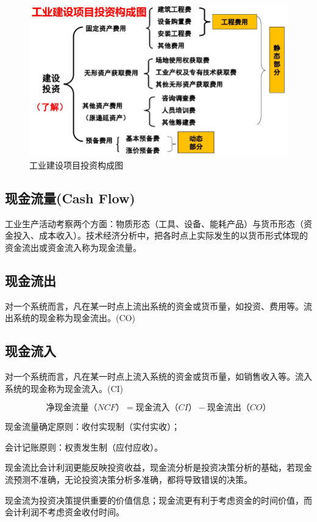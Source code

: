 \begin{figure}[H]
    \centering
    \includegraphics[width=\textwidth]{image/投资分类.png}
    \caption{工业建设项目投资构成图}
\end{figure}

\subsection{现金流量(Cash Flow)}
工业生产活动考察两个方面：物质形态（工具、设备、能耗产品）与货币形态（资金投入、成本收入）。技术经济分析中，把各时点上实际发生的以货币形式体现的资金流出或资金流入称为现金流量。

\subsection{现金流出}
对一个系统而言，凡在某一时点上流出系统的资金或货币量，如投资、费用等。流出系统的现金称为现金流出。(CO)

\subsection{现金流入}
对一个系统而言，凡在某一时点上流入系统的资金或货币量，如销售收入等。流入系统的现金称为现金流入。(CI)

$$
\mbox{净现金流量（}NCF\mbox{）}=\mbox{现金流入（}CI\mbox{）}-\mbox{现金流出（}CO\mbox{）}
$$

现金流量确定原则：收付实现制（实付实收）；

会计记账原则：权责发生制（应付应收）。

现金流比会计利润更能反映投资收益，现金流分析是投资决策分析的基础，若现金流预测不准确，无论投资决策分析多准确，都将导致错误的决策。

现金流为投资决策提供重要的价值信息；现金流更有利于考虑资金的时间价值，而会计利润不考虑资金收付时间。

